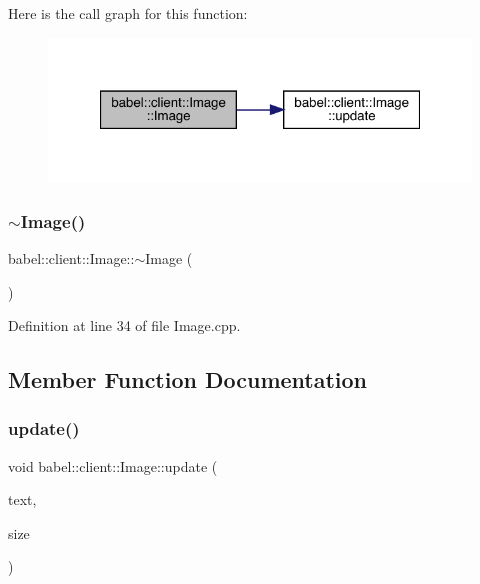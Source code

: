 Here is the call graph for this function\+:\nopagebreak
\begin{figure}[H]
\begin{center}
\leavevmode
\includegraphics[width=321pt]{classbabel_1_1client_1_1_image_a842bdeaea0276c9e1f721ced3f01dfc5_cgraph}
\end{center}
\end{figure}
\mbox{\label{classbabel_1_1client_1_1_image_a887868b77752a71a0f6108b01dea7243}} 
\subsubsection{\texorpdfstring{$\sim$\+Image()}{~Image()}}
{\footnotesize\ttfamily babel\+::client\+::\+Image\+::$\sim$\+Image (\begin{DoxyParamCaption}{ }\end{DoxyParamCaption})}



Definition at line 34 of file Image.\+cpp.



\subsection{Member Function Documentation}
\mbox{\label{classbabel_1_1client_1_1_image_a1d1329ab093dbd0383a60b96a7fcf862}} 
\subsubsection{\texorpdfstring{update()}{update()}}
{\footnotesize\ttfamily void babel\+::client\+::\+Image\+::update (\begin{DoxyParamCaption}\item[{const Q\+String}]{text,  }\item[{int}]{size }\end{DoxyParamCaption})}




